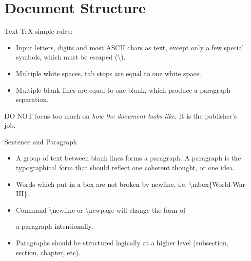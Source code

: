 \documentclass[10pt]{beamer}
\begin{document}
\section{Document Structure}
\begin{frame}[t]{Text}
    \TeX{} simple rules:
\begin{itemize}
    \item Input letters, digits and most ASCII chars as text, except only
        a few special symbols, which must be escaped
        (\alert{\textbackslash}).
    \item Multiple white spaces, tab stops are equal to one white space.
    \item Multiple blank lines are equal to one blank, which produce
        a paragraph separation.
\end{itemize}

    \alert{DO NOT} focus too much on {\em how the document looks like}.
    It is the publisher's job.

\end{frame}

\begin{frame}[t]{Sentence and Paragraph}
\begin{itemize}
    \item A group of text between blank lines forms a paragraph.
        A paragraph is the typographical form that should reflect
        one \alert{coherent} thought, or one idea.
    \item Words which put in a box are not broken by newline, i.e.
        \textbackslash mbox\{World-War-III\}.
    \item Command \alert{\textbackslash newline} or
        \alert{\textbackslash newpage} will change the form of

        a paragraph intentionally.
    \item Paragraphs should be structured logically at a higher level
        (\alert{subsection}, \alert{section}, \alert{chapter}, etc).
\end{itemize}
\end{frame}
\end{document}
